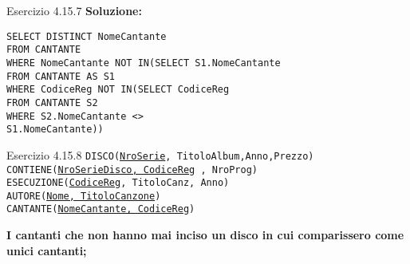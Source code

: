 \begin{frame}{Esercizio 4.15.7}
    \textbf{Soluzione:}
    \vspace{1em}
    
    \texttt{SELECT DISTINCT NomeCantante\\FROM CANTANTE\\WHERE NomeCantante NOT IN(SELECT S1.NomeCantante\\\hspace{13em}FROM CANTANTE AS S1\\\hspace{13em}WHERE CodiceReg NOT IN(SELECT CodiceReg\\\hspace{24,5em}FROM CANTANTE S2\\\hspace{24,5em}WHERE S2.NomeCantante <> \\\hspace{24,5em}S1.NomeCantante))}
    \end{frame}
\begin{frame}{Esercizio 4.15.8}
    \texttt{DISCO(\underline{NroSerie}, TitoloAlbum,Anno,Prezzo)\\
    CONTIENE(\underline{NroSerieDisco, CodiceReg} , NroProg)\\
    ESECUZIONE(\underline{CodiceReg}, TitoloCanz, Anno)\\
    AUTORE(\underline{Nome, TitoloCanzone})\\
    CANTANTE(\underline{NomeCantante, CodiceReg})}
    \vspace{1em}
    
    \textbf{I cantanti che non hanno mai inciso un disco in cui comparissero come unici cantanti;}
\end{frame}

